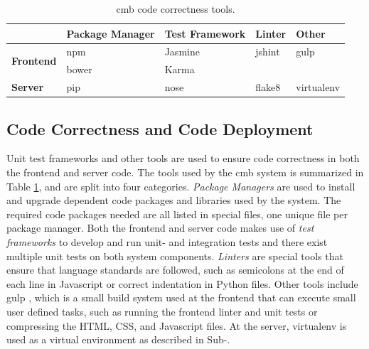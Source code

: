 \begin{table}[b!]
  \centering
  \begin{tabular}{ l|p{2.1cm}|p{2.2cm}|l|l }
    & \textbf{Package Manager} & \raggedright\textbf{Test Framework} & \textbf{Linter} & \textbf{Other} \\ \hline
  \multirow{2}{*}{\textbf{Frontend}} & npm \cite{NPM} & Jasmine \cite{JASMINE} & jshint \cite{JSHINT} & gulp \cite{GULP} \\
                                     & bower \cite{BOWER} & Karma \cite{KARMA} &  &  \\ \hline
  \multirow{1}{*}{\textbf{Server}} & pip \cite{PIP} & nose \cite{NOSE} & flake8 \cite{FLAKE8} & virtualenv \cite{VIRTUALENV}\\
  \end{tabular}
  \caption[Climbing Mont Blanc code correctness tools.]{\gls{cmb} code correctness tools.}
  \label{tab:cct}
\end{table}

\subsection{Code Correctness and Code Deployment}
\label{sec:cmb-ci}
Unit test frameworks and other tools are used to ensure code correctness in both the frontend and server code. The tools used by the \gls{cmb} system is summarized in Table \ref{tab:cct}, and are split into four categories. \textit{Package Managers} are used to install and upgrade dependent code packages and libraries used by the system. The required code packages needed are all listed in special files, one unique file per package manager. Both the frontend and server code makes use of \textit{test frameworks} to develop and run unit- and integration tests and there exist multiple unit tests on both system components. \textit{Linters} are special tools that ensure that language standards are followed, such as semicolons at the end of each line in Javascript or correct indentation in Python files. Other tools include gulp \cite{GULP}, which is a small build system used at the frontend that can execute small user defined tasks, such as running the frontend linter and unit tests or compressing the HTML, CSS, and Javascript files. At the server, virtualenv \cite{VIRTUALENV} is used as a virtual environment as described in Sub-. \\

